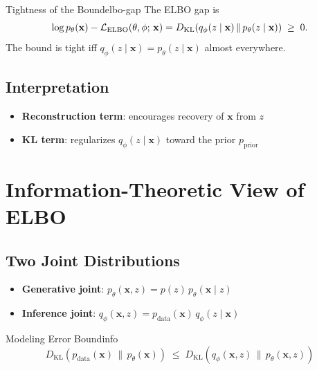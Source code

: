 \documentclass[11pt,a4paper]{article}
\newcommand{\bx}{\mathbf{x}} \newcommand{\by}{\mathbf{y}}
\newcommand{\KL}[2]{D_{\mathrm{KL}}\!\left(#1\,\|\,#2\right)}
\newcommand{\elbo}{\cL_{\mathrm{ELBO}}}
\newcommand{\pdata}{p_{\mathrm{data}}}
\newcommand{\pprior}{p_{\mathrm{prior}}}
\begin{document}
\begin{remark}{Tightness of the Bound}{elbo-gap}
The ELBO gap is
\[
    \log p_\theta(\bx) - \elbo(\theta,\phi;\,\bx)
    = \KL{q_\phi(z\mid \bx)}{p_\theta(z\mid \bx)} \;\geq\; 0 .
\]
The bound is tight iff $q_\phi(z\mid \bx)=p_\theta(z\mid \bx)$ almost everywhere.
\end{remark}

\subsection{Interpretation}

\begin{itemize}[leftmargin=1.2em, itemsep=2pt]
    \item \textbf{Reconstruction term}: encourages recovery of $\bx$ from $z$
    \item \textbf{KL term}: regularizes $q_\phi(z\mid \bx)$ toward the prior $\pprior$
\end{itemize}

\section{Information-Theoretic View of ELBO}\label{sec:info}

\subsection{Two Joint Distributions}

\begin{itemize}[leftmargin=1.2em, itemsep=2pt]
    \item \textbf{Generative joint}: $p_\theta(\bx,z)=p(z)\,p_\theta(\bx\mid z)$
    \item \textbf{Inference joint}: $q_\phi(\bx,z)=\pdata(\bx)\,q_\phi(z\mid \bx)$
\end{itemize}

\begin{proposition}{Modeling Error Bound}{info}
\[
    \KL{\pdata(\bx)}{p_\theta(\bx)} \;\leq\; \KL{q_\phi(\bx,z)}{p_\theta(\bx,z)}
\]
\end{proposition}
\end{document}

